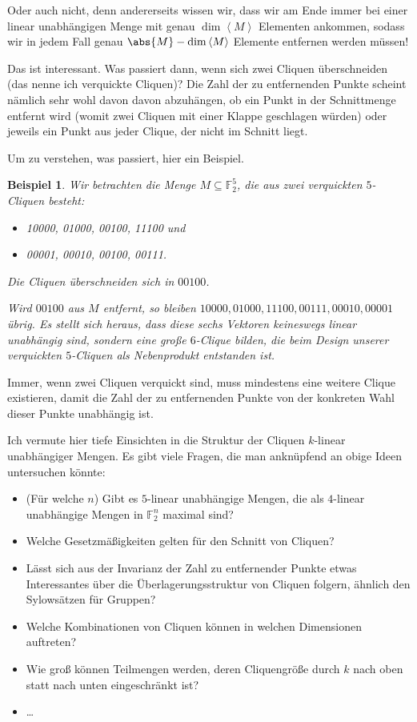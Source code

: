 \documentclass[a4paper]{scrartcl}
\theoremstyle{break}
\newtheorem{example}{Beispiel}
\newcommand{\F}{\mathbb{F}}
\begin{document}
Oder auch nicht, denn andererseits wissen wir, dass wir am Ende immer bei einer linear unabhängigen Menge mit genau $\dim \left<M\right>$
Elementen ankommen, sodass wir in jedem Fall genau $\abs{M} - \dim \left<M\right>$ Elemente entfernen werden müssen!

Das ist interessant. Was passiert dann, wenn sich zwei Cliquen überschneiden (das nenne ich verquickte Cliquen)?
Die Zahl der zu entfernenden Punkte scheint nämlich sehr wohl davon davon abzuhängen, ob ein Punkt in der Schnittmenge entfernt wird
(womit zwei Cliquen mit einer Klappe geschlagen würden) oder jeweils ein Punkt aus jeder Clique, der nicht im Schnitt liegt.

Um zu verstehen, was passiert, hier ein Beispiel.
\begin{example}
  Wir betrachten die Menge $M \subseteq \F_2^5$, die aus zwei verquickten $5$-Cliquen besteht:
  \begin{itemize}
    \item 10000, 01000, 00100, 11100 und
    \item 00001, 00010, 00100, 00111.
  \end{itemize}
  Die Cliquen überschneiden sich in $00100$.

  Wird $00100$ aus $M$ entfernt, so bleiben $10000, 01000, 11100, 00111, 00010, 00001$ übrig.
  Es stellt sich heraus, dass diese sechs Vektoren keineswegs linear unabhängig sind, sondern
  eine große $6$-Clique bilden, die beim Design unserer verquickten $5$-Cliquen als
  Nebenprodukt entstanden ist.
\end{example}
Immer, wenn zwei Cliquen verquickt sind, muss mindestens eine weitere Clique existieren, damit die Zahl der zu entfernenden Punkte
von der konkreten Wahl dieser Punkte unabhängig ist.

Ich vermute hier tiefe Einsichten in die Struktur der Cliquen $k$-linear unabhängiger Mengen. Es gibt viele Fragen, die man anknüpfend an
obige Ideen untersuchen könnte:
\begin{itemize}
  \item (Für welche $n$) Gibt es $5$-linear unabhängige Mengen, die als $4$-linear unabhängige Mengen in $\F_2^n$ maximal sind?
  \item Welche Gesetzmäßigkeiten gelten für den Schnitt von Cliquen?
  \item Lässt sich aus der Invarianz der Zahl zu entfernender Punkte etwas Interessantes über die Überlagerungsstruktur von Cliquen
    folgern, ähnlich den Sylowsätzen für Gruppen?
  \item Welche Kombinationen von Cliquen können in welchen Dimensionen auftreten?
  \item Wie groß können Teilmengen werden, deren Cliquengröße durch $k$ nach oben statt nach unten eingeschränkt ist?
  \item \ldots
\end{itemize}
\end{document}
